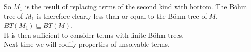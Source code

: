 So $M_1$ is the result of replacing terms of the second kind with bottom. The B\"ohm tree of $M_1$ is therefore clearly less than or equal to the B\"ohm tree of $M$. $BT(M_1) \sqsubseteq BT(M)$.\\

It is then sufficient to consider terms with finite B\"ohm trees. \qqed\\

Next time we will codify properties of unsolvable terms.